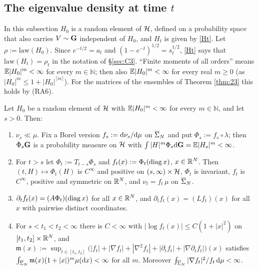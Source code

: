 \subsection{The eigenvalue density at time $t$}

In this subsection $H_0$ is a random element of $\mathcal{H}$, defined on a probability space that also carries $V\sim\mathbf{G}$ independent of $H_0$, and $H_t$ is given by \eqref{Ht}. Let $\rho:=\mathrm{law}(H_0)$.
Since $e^{-t/2}=a_t$ and $(1-e^{-t})^{1/2}=s_t^{1/2}$, \eqref{Ht} says that $\mathrm{law}(H_t)=\rho_t$ in the notation of \S\ref{sec:C3}.
``Finite moments of all orders'' means $\mathbb{E}|H_0|^m<\infty$ for every $m\in\mathbb N$; then also $\mathbb{E}|H_0|^m<\infty$ for every real $m\ge0$ (as $|H_0|^m\le1+|H_0|^{\lceil m\rceil}$). For the matrices of the ensembles of Theorem \ref{thm:23} this holds by (RA6).

\begin{proposition}\label{prop:U9}
Let $H_0$ be a random element of $\mathcal{H}$ with $\mathbb{E}|H_0|^m<\infty$ for every $m\in\mathbb N$, and let $s>0$. Then:
\begin{enumerate}[label=(\roman*),itemsep=1pt]
\item $\nu_s\ll\mu$. Fix a Borel version $f_s:=\mathrm{d}\nu_s/\mathrm{d}\mu$ on $\overline{\Sigma}_N$ and put $\Phi_s:=f_s\circ\lambda$; then $\Phi_s\mathbf{G}$ is a probability measure on $\mathcal{H}$ with $\int|H|^m\Phi_s\mathrm{d}\mathbf{G}=\mathbb{E}|H_s|^m<\infty$.
\item For $t>s$ let $\Phi_t:=T_{t-s}\Phi_s$ and $f_t(x):=\Phi_t(\operatorname{diag} x)$, $x\in\mathbb{R}^N$. Then $(t,H)\mapsto\Phi_t(H)$ is $C^\infty$ and positive on $(s,\infty)\times\mathcal{H}$, $\Phi_t$ is invariant, $f_t$ is $C^\infty$, positive and symmetric on $\mathbb{R}^N$, and
$\nu_t=f_t\,\mu$ on $\overline{\Sigma}_N$.
\item $\partial_tf_t(x)=(A\Phi_t)(\operatorname{diag} x)$ for all $x\in\mathbb{R}^N$, and $\partial_tf_t(x)=(Lf_t)(x)$ for all $x$ with pairwise distinct coordinates.
\item For $s<t_1<t_2<\infty$ there is $C<\infty$ with $|\log f_t(x)|\le C(1+|x|^2)$ on $[t_1,t_2]\times\mathbb{R}^N$, and
$\mathfrak m(x):=\sup_{t\in[t_1,t_2]}\big(|f_t|+|\nabla f_t|+|\nabla^2f_t|+|\partial_tf_t|+|\nabla\partial_tf_t|\big)(x)$ satisfies $\int_{\overline{\Sigma}_N}\mathfrak m(x)(1+|x|)^m\mu(\mathrm{d} x)<\infty$ for all $m$. Moreover $\int_{\overline{\Sigma}_N}|\nabla f_t|^2/f_t\,\mathrm{d}\mu<\infty$.
\end{enumerate}
\end{proposition}

